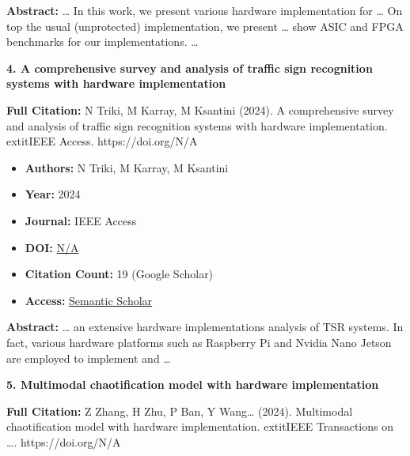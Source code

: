 \documentclass[11pt,a4paper]{article}
\begin{document}
\textbf{Abstract:} … In this work, we present various hardware implementation for … On top the usual (unprotected) implementation, we present … show ASIC and FPGA benchmarks for our implementations. …\par\vspace{0.5em}



\textbf{4. A comprehensive survey and analysis of traffic sign recognition systems with hardware implementation}

\textbf{Full Citation:} N Triki, M Karray, M Ksantini (2024). A comprehensive survey and analysis of traffic sign recognition systems with hardware implementation. 	extit{IEEE Access}. https://doi.org/N/A

\begin{resultbox}
\begin{itemize}[leftmargin=*]
    \item \textbf{Authors:} N Triki, M Karray, M Ksantini
    \item \textbf{Year:} 2024
    \item \textbf{Journal:} IEEE Access
    
    
    
    \item \textbf{DOI:} \href{https://doi.org/}{N/A}
    \item \textbf{Citation Count:} 19 (Google Scholar)
    \item \textbf{Access:} \href{https://ieeexplore.ieee.org/abstract/document/10679144/}{Semantic Scholar}
\end{itemize}
\end{resultbox}

\textbf{Abstract:} … an extensive hardware implementations analysis of TSR systems. In fact, various hardware platforms such as Raspberry Pi and Nvidia Nano Jetson are employed to implement and …\par\vspace{0.5em}



\textbf{5. Multimodal chaotification model with hardware implementation}

\textbf{Full Citation:} Z Zhang, H Zhu, P Ban, Y Wang… (2024). Multimodal chaotification model with hardware implementation. 	extit{IEEE Transactions on …}. https://doi.org/N/A
\end{document}
